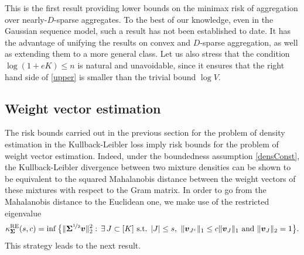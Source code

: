 This is the first result providing lower bounds on the minimax risk of aggregation over
nearly-$D$-sparse aggregates. To the best of our knowledge, even in the Gaussian sequence
model, such a result has not been established to date. It has the advantage of
unifying the results on convex and $D$-sparse aggregation, as well as extending them
to a more general class. Let us also stress that the condition $\log(1+eK)\le n$ 
is natural and unavoidable, since it ensures that the right hand side of \eqref{upper} 
is smaller than the trivial bound $\log V$.

\subsection{Weight vector estimation}
\label{ssec:weight}

The risk bounds carried out in the previous section for the problem of
density estimation in the Kullback-Leibler loss imply risk bounds for
the problem of weight vector estimation. Indeed, under the boundedness
assumption \eqref{densConst}, the Kullback-Leibler divergence between
two mixture densities can be shown to be equivalent to the squared
Mahalanobis distance between the weight vectors of these mixtures with
respect to the Gram matrix.  In order to go from the Mahalanobis distance
to the Euclidean one, we make use of the restricted eigenvalue
\begin{equation}
\kappa^{\rm RE}_{\bSigma}(s,c)=\inf\big\{\| \bSigma^{\nicefrac12}\bv\|_2^{2}:\,
\exists\,J\subset [K] \text{ s.t. } |J|\le s,\
\|\bv_{J^{c}}\|_{1}\le c\|\bv_{J}\|_{1}\ \text{and}\ \|\bv_{J}\|_{2}=1\big\}.
\end{equation}
This strategy leads to the next result.


